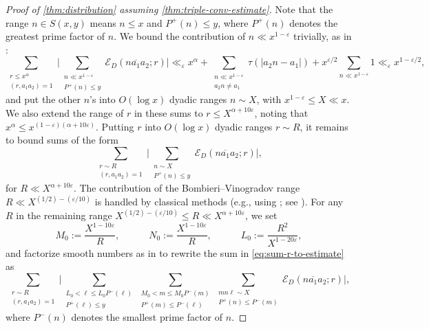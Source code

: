 \documentclass[reqno,11pt]{amsart}
\theoremstyle{definition}
\theoremstyle{remark}
\numberwithin{equation}{section}
\newcommand{\mE}{\mathcal{E}}
\newcommand{\eps}{\varepsilon}
\renewcommand{\bar}{\overline}
\begin{document}
\begin{proof}[Proof of \cref{thm:distribution} assuming \cref{thm:triple-conv-estimate}]
Note that the range $n \in S(x, y)$ means $n \le x$ and $P^+(n) \le y$, where $P^+(n)$ denotes the greatest prime factor of $n$. We bound the contribution of $n \ll x^{1-\eps}$ trivially, as in \cite[p.\ 855]{drappeau2015theoremes}:
\[
    \sum_{\substack{r \le x^{\alpha} \\ (r, a_1 a_2) = 1}} 
    \bigg\vert  \sum_{\substack{n \ll x^{1-\eps} \\ P^+(n) \le y}} \mE_D(n\bar{a_1}a_2; r)
    \bigg\vert 
    \ll_\eps
    x^{\alpha} + \sum_{\substack{n \ll x^{1-\eps} \\ a_2 n \neq a_1}} \tau(|a_2n - a_1|)
    +
    x^{\eps/2} \sum_{n \ll x^{1-\eps}} 1 \ll_\eps x^{1-\eps/2},
\]
and put the other $n$'s into $O(\log x)$ dyadic ranges $n \sim X$, with $x^{1-\eps} \le X \ll x$. We also extend the range of $r$ in these sums to $r \le X^{{\alpha} + 10\eps}$, noting that $x^{\alpha} \le x^{(1-\eps)({\alpha} + 10\eps)}$. Putting $r$ into $O(\log x)$ dyadic ranges $r \sim R$, it remains to bound sums of the form
\begin{equation} \label{eq:sum-r-to-estimate}
    \sum_{\substack{r \sim R \\ (r, a_1 a_2) = 1}} 
    \bigg\vert \sum_{\substack{n \sim X \\ P^+(n) \le y}} \mE_D(n\bar{a_1}a_2; r)
    \bigg\vert,
\end{equation}
for $R \ll X^{{\alpha}+10\eps}$. The contribution of the Bombieri--Vinogradov range $R \ll X^{(1/2) - (\eps/10)}$ is handled by classical methods (e.g., using \cite[Theorem 17.4]{iwaniec2021analytic}; see \cite{drappeau2015theoremes,drappeau2017smooth}). For any $R$ in the remaining range $X^{(1/2) - (\eps/10)} \le R \ll X^{{\alpha}+10\eps}$, we set
\begin{equation} \label{eq:parameters-2}
    M_0 := \frac{X^{1-10\eps}}{R},
    \qquad\quad
    N_0 := \frac{X^{1-10\eps}}{R},
    \qquad\quad
    L_0 := \frac{R^2}{X^{1-20\eps}},
\end{equation}
and factorize smooth numbers as in \cite[Lemme 7]{drappeau2015theoremes} to rewrite the sum in \cref{eq:sum-r-to-estimate} as
\[
    \sum_{\substack{r \sim R \\ (r, a_1a_2) = 1}}
    \bigg\vert 
    \sum_{\substack{L_0 < \ell \le L_0 P^-(\ell) \\ P^+(\ell) \le y}}
    \sum_{\substack{M_0 < m \le M_0 P^-(m) \\ P^+(m) \le P^-(\ell)}}
    \sum_{\substack{mn\ell \sim X \\ P^+(n) \le P^-(m)}}
    \mE_D(n\bar{a_1}a_2; r)
    \bigg\vert,
\]
where $P^-(n)$ denotes the smallest prime factor of $n$.


\end{proof}
\end{document}
